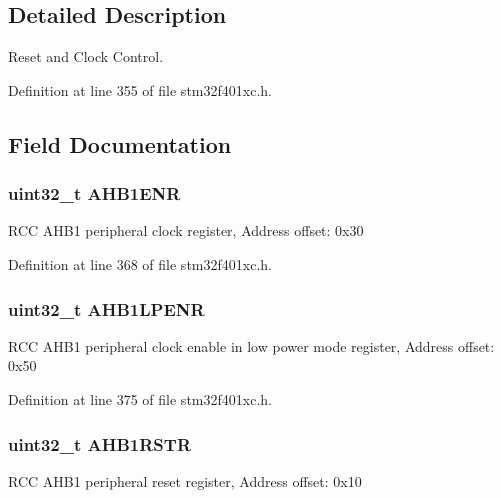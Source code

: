 \subsection{Detailed Description}
Reset and Clock Control. 

Definition at line 355 of file stm32f401xc.\+h.



\subsection{Field Documentation}
\subsubsection[{\texorpdfstring{A\+H\+B1\+E\+NR}{AHB1ENR}}]{ uint32\+\_\+t A\+H\+B1\+E\+NR}\hypertarget{struct_r_c_c___type_def_a1e9c75b06c99d0611535f38c7b4aa845}{}\label{struct_r_c_c___type_def_a1e9c75b06c99d0611535f38c7b4aa845}
R\+CC A\+H\+B1 peripheral clock register, Address offset\+: 0x30 

Definition at line 368 of file stm32f401xc.\+h.

\subsubsection[{\texorpdfstring{A\+H\+B1\+L\+P\+E\+NR}{AHB1LPENR}}]{ uint32\+\_\+t A\+H\+B1\+L\+P\+E\+NR}\hypertarget{struct_r_c_c___type_def_aae70b1922167eb58d564cb82d39fd10b}{}\label{struct_r_c_c___type_def_aae70b1922167eb58d564cb82d39fd10b}
R\+CC A\+H\+B1 peripheral clock enable in low power mode register, Address offset\+: 0x50 

Definition at line 375 of file stm32f401xc.\+h.

\subsubsection[{\texorpdfstring{A\+H\+B1\+R\+S\+TR}{AHB1RSTR}}]{ uint32\+\_\+t A\+H\+B1\+R\+S\+TR}\hypertarget{struct_r_c_c___type_def_a46c20c598e9e12f919f0ea47ebcbc90f}{}\label{struct_r_c_c___type_def_a46c20c598e9e12f919f0ea47ebcbc90f}
R\+CC A\+H\+B1 peripheral reset register, Address offset\+: 0x10 

